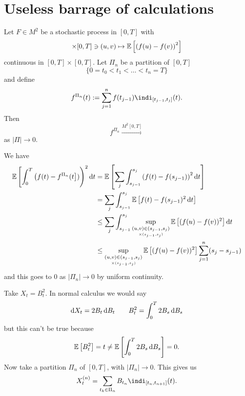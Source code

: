 \documentclass[12pt]{report}
\begin{document}
\section{Useless barrage of calculations}
\begin{lemma}
	Let $F\in M^{2}$ be a stochastic process in $[0,T]$ with
	\begin{equation*}
		[0,T]\times[0,T]\ni(u,v)\mapsto\ev{\left(f(u)-f(v)\right)^{2}}
	\end{equation*}
	continuous in $[0,T]\times[0,T]$. Let $\Pi_{n}$ be a partition of $[0,T]$
	\begin{equation*}
		\{0=t_{0}<t_{1}<\ldots<t_{n}=T\}
	\end{equation*}and define
	\begin{equation*}
		f^{\Pi_{n}}(t):=\sum_{j=1}^{n}f(t_{j-1})\indi_{[t_{j-1},t_{j}]}(t).
	\end{equation*}
	Then 
	\begin{equation*}
		f^{\Pi_{n}}\xrightarrow{M^{2}[0,T]}
	\end{equation*}
	as $|\Pi|\to0$.
\end{lemma}
\begin{fancyproof}
	We have
	\begin{align*}
		\mathbb{E}\left[\int_{0}^{T}\left(f(t)-f^{\Pi_{n}}(t\right])\right)^{2}\mathop{}\!\mathrm{d} t&=\mathbb{E}\left[\sum_{j}\int_{s_{j-1}}^{s_{j}}\left(f(t)-f(s_{j-1})\right)^{2}\mathop{}\!\mathrm{d} t\right]\\
		&=\sum_{j}\int_{{s}_{j-1}}^{s_{j}}\mathbb{E}\left[f(t)-f(s_{j-1})^{2}\mathop{}\!\mathrm{d} t\right]\\
		&\leq\sum_{j}\int_{s_{j-1}}^{s_{j}}\sup_{\underset{\times(s_{j-1},s_{j})}{(u,v)\in(s_{j-1},s_{j})}}\mathbb{E}\left[(f(u)-f(v))^{2}\right]\mathop{}\!\mathrm{d} t\\
		&\leq\sup_{\underset{\times(s_{j-1},s_{j})}{(u,v)\in(s_{j-1},s_{j})}}\mathbb{E}\left[(f(u)-f(v))^{2}\right]\sum_{j=1}^{n}(s_{j}-s_{j-1})
	\end{align*}
	and this goes to 0 as $|\Pi_{n}|\to0$ by uniform continuity.
\end{fancyproof}
Take $X_{t}=B^{2}_{t}$. In normal calculus we would say
\begin{equation*}
	\mathop{}\!\mathrm{d} X_{t}=2B_{t}\mathop{}\!\mathrm{d} B_{t}\qquad B^{2}_{t}=\int_{0}^{T}2B_{s}\mathop{}\!\mathrm{d} B_{s}
\end{equation*}
but this can't be true because
\begin{equation*}
	\mathbb{E}\left[B^{2}_{t}\right]=t\neq\mathbb{E}\left[\int_{0}^{T}2B_{s}\mathop{}\!\mathrm{d} B_{s}\right]=0.
\end{equation*}
Now take a partition $\Pi_{n}$ of $[0,T]$, with $|\Pi_{n}|\to0$. This gives us
\begin{equation*}
	X_{t}^{(n)}=\sum_{t_{k}\in\Pi_{n}}B_{t_{n}}\indi_{[t_{n},t_{n+1}]}(t).
\end{equation*} 
\end{document}
